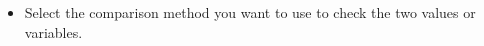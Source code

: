 
\begin{itemize}
\item Select the comparison method you want to use to check the two values or variables.
\end{itemize}
